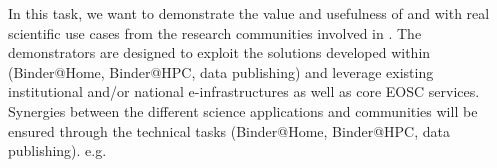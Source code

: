 \begin{task}[
  title=Science demonstrators,
  id=demos,
  lead=MP,
  PM=8,
  wphases={0-36},
  partners={IFR,UIO}
]

  In this task, we want to demonstrate the value and usefulness of  and
   with real scientific use cases from the research communities involved in \TheProject.
  The demonstrators are designed to exploit the solutions developed within \TheProject (Binder@Home, Binder@HPC, data publishing)
  and leverage existing institutional and/or national e-infrastructures as well as core EOSC services.
  Synergies between the different science applications and communities will be ensured through the technical tasks (Binder@Home, Binder@HPC, data publishing).
  e.g. 


\end{task}
